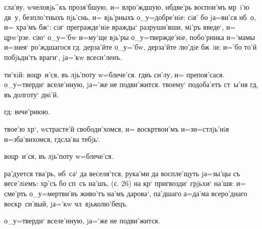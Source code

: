 
 сла'ву, w\т человjь^къ прозя'бшую, и= 
вл ро'ждшую, нб две'рь воспои'мъ мр~i'ю дв~у, 
безпло'тныхъ пjь'снь, и= вjь'рныхъ о_у=добре'нiе: сiя' бо 
jа=ви'ся нб~о, и= хра'мъ бж`: сiя` прегражде'нiе 
вражды` разруши'вши, мi'ръ введе`, и= цр w'рзе. 
сiю` о_у='бw и=му'ще вjь'ры о_у=твержде'нiе, побо'рника 
и='мамы и=з\ъ нея` ро'ждшагося гд. дерза'йте о_у='бw, 
дерза'йте лю'дiе бж~iи: и='бо то'й побjьди'тъ враги`, 
jа='кw всеси'ленъ.

  ти'хiй:              воцр~и'ся, въ 
лjь'поту w=блече'ся.   гд въ 
си'лу, и= препоя'сася.   о_у=тверди` 
вселе'нную, jа='же не подви'жится.   
твоему` подоба'етъ ст~ы'ня гд, въ долготу` днi'й.

    гд: 
 вече'рнюю. 


 твое'ю хр`, w\т страсте'й свободи'хомся, 
и= воскр твои'мъ и=з\ъ и=стлjь'нiя и=зба'вихомся, 
гд сла'ва тебjь`.


  воцр~и'ся, въ лjь'поту w=блече'ся.

 ра'дуется тва'рь, нб~са` да веселя'тся, рука'ми да 
воспле'щуть jа=зы'цы съ весе'лiемъ: хр'съ бо сп~съ 
на'шъ, (с. 26) на кр` пригвозди` грjьхи` на'шя: и= 
сме'рть о_у=мертви'въ живо'тъ на'мъ дарова`, па'дшаго 
а=да'ма всеро'днаго воскр~си'вый, jа='кw чл~вjьколю'бецъ.

  о_у=тверди` вселе'нную, jа='же не 
подви'жится.

